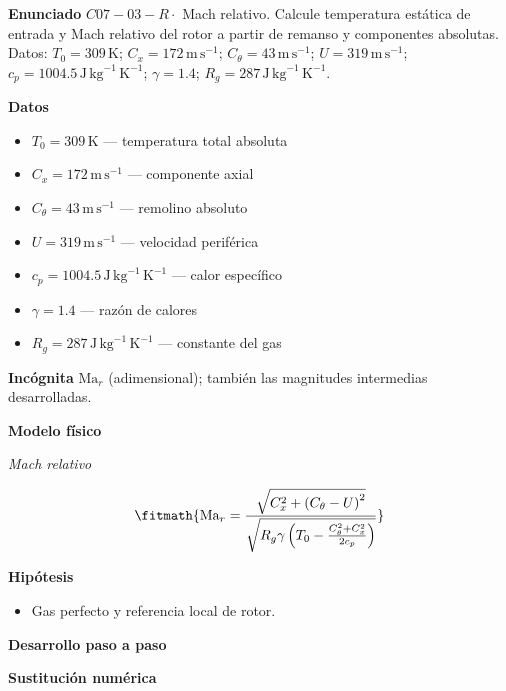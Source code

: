 \documentclass[10pt,openany]{book}
\begin{document}
\begin{tcolorbox}[title={Problema resuelto 3}, studiumworked, breakable]

\noindent\textbf{Enunciado}
\(C07-03-R \cdot\) Mach relativo. Calcule temperatura estática de entrada y Mach relativo del rotor a partir de remanso y componentes absolutas. Datos: \(T_0=309\, \mathrm{K}\); \(C_x=172\, \mathrm{m}\,\mathrm{s}^{-1}\); \(C_\theta=43\, \mathrm{m}\,\mathrm{s}^{-1}\); \(U=319\, \mathrm{m}\,\mathrm{s}^{-1}\); \(c_p=1004.5\, \mathrm{J}\,\mathrm{kg}^{-1}\,\mathrm{K}^{-1}\); \(\gamma=1.4\); \(R_g=287\, \mathrm{J}\,\mathrm{kg}^{-1}\,\mathrm{K}^{-1}\).

\noindent\textbf{Datos}
\begin{itemize}
\item $T_0 = 309\,\mathrm{K}$ — temperatura total absoluta
\item $C_x = 172\,\mathrm{m}\,\mathrm{s}^{-1}$ — componente axial
\item $C_\theta = 43\,\mathrm{m}\,\mathrm{s}^{-1}$ — remolino absoluto
\item $U = 319\,\mathrm{m}\,\mathrm{s}^{-1}$ — velocidad periférica
\item $c_p = 1004.5\,\mathrm{J}\,\mathrm{kg}^{-1}\,\mathrm{K}^{-1}$ — calor específico
\item $\gamma = 1.4$ — razón de calores
\item $R_g = 287\,\mathrm{J}\,\mathrm{kg}^{-1}\,\mathrm{K}^{-1}$ — constante del gas
\end{itemize}

\noindent\textbf{Incógnita}
$\mathrm{Ma}_r$ (adimensional); también las magnitudes intermedias desarrolladas.

\noindent\textbf{Modelo físico}

\noindent\textit{Mach relativo}

\[
\fitmath{\mathrm{Ma}_r=\frac{\sqrt{C_x^{2} + \left(C_\theta - U\right)^{2}}}{\sqrt{R_g \gamma \left(T_0 - \frac{C_\theta^{2} + C_x^{2}}{2 c_p}\right)}}}
\]

\noindent\textbf{Hipótesis}
\begin{itemize}
\item Gas perfecto y referencia local de rotor.
\end{itemize}

\noindent\textbf{Desarrollo paso a paso}



\noindent\textbf{Sustitución numérica}


\end{tcolorbox}
\end{document}
